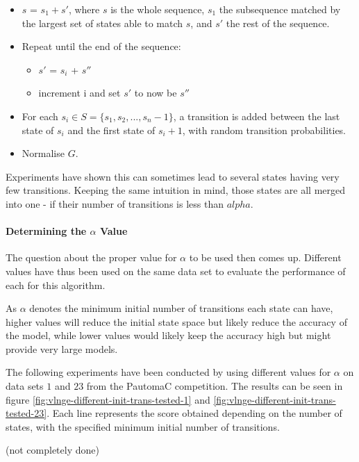 \begin{itemize}
	\item $s$ = $s_1 + s'$, where $s$ is the whole sequence, $s_1$ the subsequence matched by the largest set of states able to match $s$, and $s'$ the rest of the sequence.
	\item Repeat until the end of the sequence:
	\begin{itemize}
		\item $s'$ = $s_i$ + $s''$
		\item increment i and set $s'$ to now be $s''$
	\end{itemize}
	\item For each $s_i \in S = \{s_1, s_2, ... , s_n-1\}$, a transition is added between the last state of $s_i$ and the first state of $s_i+1$, with random transition probabilities.
	\item Normalise $G$.
\end{itemize}

Experiments have shown this can sometimes lead to several states having very few transitions. Keeping the same intuition in mind, those states are all merged into one - if their number of transitions is less than $alpha$.

\paragraph{Determining the $\alpha$ Value}

The question about the proper value for $\alpha$ to be used then comes up. Different values have thus been used on the same data set to evaluate the performance of each for this algorithm.

As $\alpha$ denotes the minimum initial number of transitions each state can have, higher values will reduce the initial state space but likely reduce the accuracy of the model, while lower values would likely keep the accuracy high but might provide very large models.

The following experiments have been conducted by using different values for $\alpha$ on data sets $1$ and $23$ from the PautomaC competition. The results can be seen in figure \ref{fig:vlnge-different-init-trans-tested-1} and \ref{fig:vlnge-different-init-trans-tested-23}. Each line represents the score obtained depending on the number of states, with the specified minimum initial number of transitions.

(not completely done)

